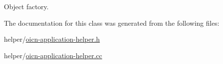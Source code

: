 Object factory. 



The documentation for this class was generated from the following files\-:\begin{DoxyCompactItemize}
\item 
helper/\hyperlink{oicn-application-helper_8h}{oicn-\/application-\/helper.\-h}\item 
helper/\hyperlink{oicn-application-helper_8cc}{oicn-\/application-\/helper.\-cc}\end{DoxyCompactItemize}
